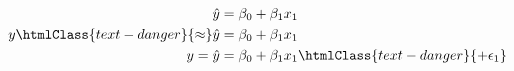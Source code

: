 \[%
\begin{aligned}
    \hat{y} & = \beta_0 + \beta_1 x_1 \\
    y \htmlClass{text-danger}{\approx} \hat{y} & = \beta_0 + \beta_1 x_1 \\
    y = \hat{y} & = \beta_0 + \beta_1 x_1 \htmlClass{text-danger}{+ \epsilon_1} \\
\end{aligned}
\]
